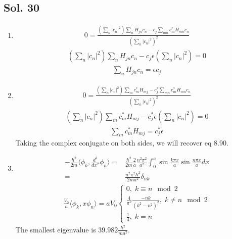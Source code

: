 \subsection*{Sol. 30}
\begin{enumerate}
    \item 
    \begin{align*}
        0
        =
        \frac{
        (
        \sum_n|c_n|^2
        )\sum_{n}H_{jn}c_n
        -
        c_j\sum_{mn}c_m^*H_{mn}c_n
        }{(\sum_n|c_n|^2)^2}
    \end{align*}
    \begin{align*}
        (
        \sum_n|c_n|^2
        )\sum_{n}H_{jn}c_n
        -
        c_j\epsilon(
        \sum_n|c_n|^2
        )=0
    \end{align*}
    \begin{align*}
        \sum_n H_{jn}c_n=\epsilon c_j
    \end{align*}
    \item 
    \begin{align*}
        0
        =
        \frac{
        (
        \sum_n|c_n|^2
        )\sum_{m}c_m^*H_{mj}
        -
        c_j^*\sum_{mn}c_m^*H_{mn}c_n
        }{(\sum_n|c_n|^2)^2}
    \end{align*}
    \begin{align*}
        (
        \sum_n|c_n|^2
        )\sum_{m}c_m^*H_{mj}
        -
        c_j^*\epsilon(
        \sum_n|c_n|^2
        )=0
    \end{align*}
    \begin{align*}
        \sum_{m}c_m^*H_{mj}
        =
        c_j^*\epsilon
    \end{align*}
    Taking the complex conjugate on both sides, we will recover eq 8.90.
    \item 
    \begin{align*}
        -\frac{\hbar^2}{2m}
        \langle\phi_k, \frac{d^2}{dx^2}\phi_n\rangle
        =&\frac{\hbar^2}{2m}
        \frac{2}{a}
        \frac{n^2\pi^2}{a^2}
        \int_0^a \sin \frac{k\pi x}{a}
        \sin\frac{n\pi x}{a}
        dx\\
        =&
       \frac{n^2\pi^2\hbar^2}{2ma^2}
        \delta_{nk}
    \end{align*}
    \begin{align*}
        \frac{V_0}{a}
        \langle\phi_k, x\phi_n\rangle
        =
        aV_0
        \begin{cases}
        0,\; k\equiv n\mod 2\\
        \frac{4}{\pi^2}
        \frac{-nk}{(k^2-n^2)^2}
        ,\; k\neq  n\mod 2\\
        \frac{1}{4}, \; k=n
        \end{cases}
    \end{align*}
    The smallest eigenvalue is $39.982\frac{\hbar^2}{ma^2}.$

\end{enumerate}